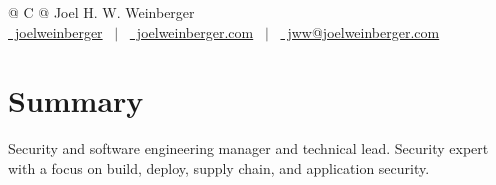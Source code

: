 \documentclass[a4paper,12pt]{article}
\begin{document}
\pagestyle{empty} 



\begin{tabularx}{\linewidth}{@{} C @{}}
\Huge{Joel H. W. Weinberger} \\[7.5pt]
\href{https://www.linkedin.com/in/joelweinberger/}{\raisebox{-0.05\height}\faLinkedin\ joelweinberger} \ $|$ \ 
\href{https://www.joelweinberger.us}{\raisebox{-0.05\height}\faGlobe \ joelweinberger.com} \ $|$ \ 
\href{mailto:jww@joelweinberger.us}{\raisebox{-0.05\height}\faEnvelope \ jww@joelweinberger.com} \ %
\end{tabularx}


\section{Summary}
Security and software engineering manager and technical lead. Security expert with a focus on build, deploy, supply chain, and application security.

\end{document}
